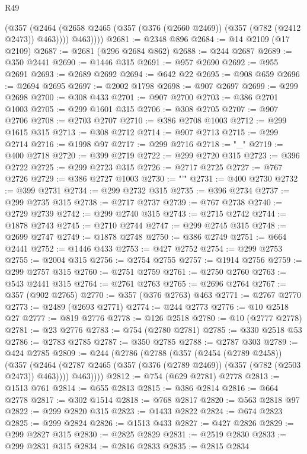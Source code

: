 \begin{lexlean}{R49}
\begin{coremodule}
          (@357
            (@2464 (@2658 @2465 (@357 (@376 (@2660 @2469)) (@357 (@782 (@2412 @2473)) @463))))
            @463))))
@2681 := @2348 @896
@2684 := @14 @2109 (@17 @2109)
@2687 := @2681 (@296 @2684 @862)
@2688 := @244 @2687
@2689 := @350 @2441
@2690 := @1446 @315
@2691 := @957 @2690
@2692 := @955 @2691
@2693 := @2689 @2692
@2694 := @642 @22
@2695 := @908 @659
@2696 := @2694 @2695
@2697 := @2002 @1798
@2698 := @907 @2697
@2699 := @299 @2698
@2700 := @308 @433
@2701 := @907 @2700
@2703 := @386 @2701 @1003
@2705 := @299 @1601 @315
@2706 := @308 @2705
@2707 := @907 @2706
@2708 := @2703 @2707
@2710 := @386 @2708 @1003
@2712 := @299 @1615 @315
@2713 := @308 @2712
@2714 := @907 @2713
@2715 := @299 @2714
@2716 := @1998 @97
@2717 := @299 @2716
@2718 := "_"
@2719 := @400 @2718
@2720 := @399 @2719
@2722 := @299 @2720 @315
@2723 := @396 @2722
@2725 := @299 @2723 @315
@2726 := @2717 @2725
@2727 := @767 @2726
@2729 := @386 @2727 @1003
@2730 := "'"
@2731 := @400 @2730
@2732 := @399 @2731
@2734 := @299 @2732 @315
@2735 := @396 @2734
@2737 := @299 @2735 @315
@2738 := @2717 @2737
@2739 := @767 @2738
@2740 := @2729 @2739
@2742 := @299 @2740 @315
@2743 := @2715 @2742
@2744 := @1878 @2743
@2745 := @2710 @2744
@2747 := @299 @2745 @315
@2748 := @2699 @2747
@2749 := @1878 @2748
@2750 := @386 @2749
@2751 := @664 @2441
@2752 := @1446 @433
@2753 := @427 @2752
@2754 := @299 @2753
@2755 := @2004 @315
@2756 := @2754 @2755
@2757 := @1914 @2756
@2759 := @299 @2757 @315
@2760 := @2751 @2759
@2761 := @2750 @2760
@2763 := @543 @2441 @315
@2764 := @2761 @2763
@2765 := @2696 @2764
@2767 := @357 (@902 @2765)
@2770 := @357 (@376 @2763) @463
@2771 := @2767 @2770
@2773 := @2489 (@2693 @2771)
@2774 := @244 @2773
@2776 := @10 @2518 @27
@2777 := @819 @2776
@2778 := @126 @2518
@2780 := @10 (@2777 @2778)
@2781 := @23 @2776
@2783 := @754 (@2780 @2781)
@2785 := @330 @2518 @53
@2786 := @2783 @2785
@2787 := @350 @2785
@2788 := @2787 @303
@2789 := @424 @2785
@2809 := @244
    (@2786
      (@2788
        (@357
          (@2454 (@2789 @2458))
          (@357
            (@2464 (@2787 @2465 (@357 (@376 (@2789 @2469)) (@357 (@782 (@2503 @2473)) @463))))
            @463))))
@2812 := @754 (@629 @2781) @2778
@2813 := @1513 @761
@2814 := @655 @2813
@2815 := @386 @2814
@2816 := @664 @2778
@2817 := @302 @1514
@2818 := @768 @2817
@2820 := @563 @2818 @97
@2822 := @299 @2820 @315
@2823 := @1433 @2822
@2824 := @674 @2823
@2825 := @299 @2824
@2826 := @1513 @433
@2827 := @427 @2826
@2829 := @299 @2827 @315
@2830 := @2825 @2829
@2831 := @2519 @2830
@2833 := @299 @2831 @315
@2834 := @2816 @2833
@2835 := @2815 @2834

\end{coremodule}
\end{lexlean}
